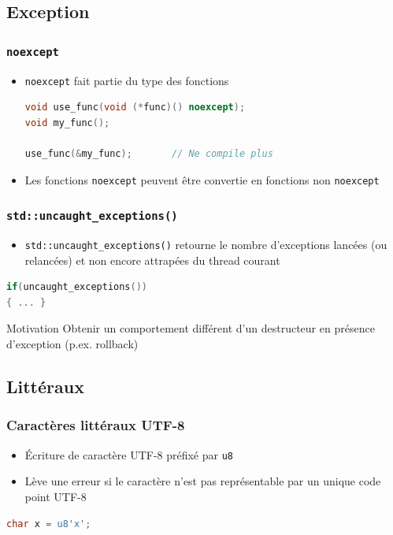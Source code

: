 \documentclass[C++.tex]{subfiles}
\begin{document}
\subsection*{Exception}
\begin{frame}[fragile]
	\frametitle{\lstinline|noexcept|}
	\begin{itemize}
		\item \lstinline|noexcept| fait partie du type des fonctions

		\begin{lstlisting}[language=C++]
void use_func(void (*func)() noexcept);
void my_func();

use_func(&my_func);       // Ne compile plus\end{lstlisting}


		\item Les fonctions \lstinline|noexcept| peuvent être convertie en fonctions non \lstinline|noexcept|
	\end{itemize}	

\end{frame}

\begin{frame}[fragile]
	\frametitle{\lstinline|std::uncaught_exceptions()|}
	\begin{itemize}
		\item \lstinline|std::uncaught_exceptions()| retourne le nombre d'exceptions lancées (ou relancées) et non encore attrapées du thread courant
	\end{itemize}

	\begin{lstlisting}[language=C++]
if(uncaught_exceptions())
{ ... }\end{lstlisting}

	\begin{block}{Motivation}
		Obtenir un comportement différent d'un destructeur en présence d'exception (p.ex. rollback)
	\end{block}
\end{frame}

\subsection*{Littéraux}
\begin{frame}[fragile]
	\frametitle{Caractères littéraux UTF-8}
	\begin{itemize}
		\item Écriture de caractère UTF-8 préfixé par \lstinline|u8|
		\item Lève une erreur si le caractère n'est pas représentable par un unique code point UTF-8
	\end{itemize}

	\begin{lstlisting}[language=C++]
char x = u8'x';\end{lstlisting}

\end{frame}
\end{document}
